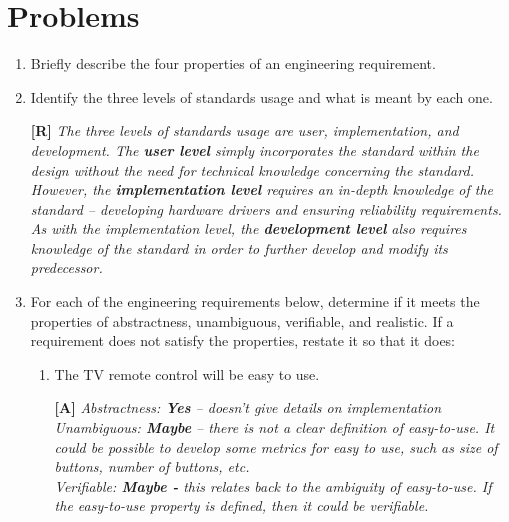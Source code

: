 \section{Problems}
\label{section:reqSpecProblems}
\graphicspath{ {./chapter03/FigSolutions} }

\begin{enumerate}
\def\labelenumi{\arabic{enumi}.}
\item
  Briefly describe the four properties of an engineering requirement.
  
  
\item
  Identify the three levels of standards usage and what is meant by each one.
  
 \begin{onlysolution}
 \textbf{[R]}
 \itshape
  The three levels of standards usage are user, implementation, and
development. The \textbf{user level} simply incorporates the standard
within the design without the need for technical knowledge concerning
the standard. However, the \textbf{implementation level} requires an
in-depth knowledge of the standard -- developing hardware drivers and
ensuring reliability requirements. As with the implementation level, the
\textbf{development level} also requires knowledge of the standard in
order to further develop and modify its predecessor.
\end{onlysolution}
  
  
\item
  For each of the engineering requirements below, determine if it meets
  the properties of abstractness, unambiguous, verifiable, and
  realistic. If a requirement does not satisfy the properties, restate
  it so that it does:


\begin{enumerate}
\def\labelenumi{\alph{enumi})}
\item
  The TV remote control will be easy to use.
  
\begin{onlysolution}
\textbf{[A]}
 \itshape
 Abstractness: \textbf{Yes} -- doesn't give details on implementation\\
Unambiguous: \textbf{Maybe} -- there is not a clear definition of
easy-to-use. It could be possible to develop some metrics for easy to
use, such as size of buttons, number of buttons, etc.\\
Verifiable: \textbf{Maybe -} this relates back to the ambiguity of
easy-to-use. If the easy-to-use property is defined, then it could be
verifiable.
\end{onlysolution}
  

\end{enumerate}
\end{enumerate}
